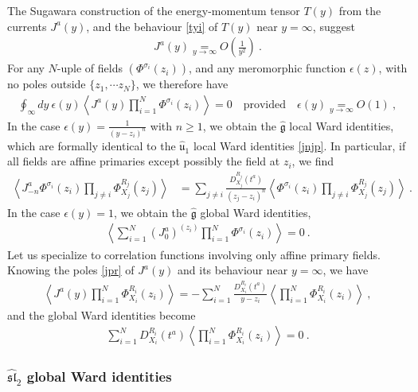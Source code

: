 \documentclass[12pt, a4paper, notitlepage, twoside]{report}
\numberwithin{equation}{section}
\theoremstyle{break}
\begin{document}
The Sugawara construction of the energy-momentum tensor $T(y)$ from the currents $J^a(y)$, and the behaviour \eqref{tyi} of $T(y)$ near $y=\infty$, suggest
\begin{align}
 \boxed{J^a(y) \underset{y\to \infty}{=} O\left(\frac{1}{y^2}\right)}\ .
\label{jayi}
\end{align}
For any $N$-uple of fields $(\Phi^{\sigma_i}(z_i))$, and any meromorphic function $\epsilon(z)$, with no poles outside $\{z_1,\cdots z_N\}$, we therefore have 
\begin{align}
 \oint_\infty dy\ \epsilon(y) \left\langle J^a(y)  \prod_{i=1}^N \Phi^{\sigma_i}(z_i)\right\rangle = 0 \quad \text{provided} \quad \epsilon(y) \underset{y\to\infty}{=} O(1)\ ,
\end{align}
In the case $\epsilon(y)=\frac{1}{(y-z_i)^n}$ with $n\geq 1$, we obtain the $\hat{\mathfrak{g}}$ local Ward identities, which are formally identical to the $\hat{\mathfrak{u}}_1$ local Ward identities \eqref{jnjp}. 
In particular, if all fields are affine primaries except possibly the field at $z_i$, we find 
\begin{align}
\left\langle J^a_{-n}\Phi^{\sigma_i}(z_i)\prod_{j\neq i} \Phi^{R_j}_{X_j}(z_j)\right\rangle &=\sum_{j\neq i} \frac{D_{X_j}^{R_j}(t^a)}{(z_j-z_i)^n} \left\langle \Phi^{\sigma_i}(z_i)\prod_{j\neq i} \Phi^{R_j}_{X_j}(z_j)\right\rangle\ . 
\label{jmnz}
\end{align}
In the case $\epsilon(y)=1$, we obtain the $\hat{\mathfrak{g}}$ global Ward identities,
\begin{align}
 \left\langle \sum_{i=1}^N (J_0^a)^{(z_i)} \prod_{i=1}^N \Phi^{\sigma_i}(z_i)\right\rangle=0\ .
\end{align}
Let us specialize to correlation functions involving only affine primary fields.
Knowing the poles \eqref{jpr} of $J^a(y)$ and its behaviour near $y=\infty$, we have
\begin{align}
 \left\langle J^a(y) \prod_{i=1}^N \Phi^{R_i}_{X_i}(z_i)\right\rangle = - \sum_{i=1}^N \frac{D^{R_i}_{X_i}(t^a)}{y-z_i}\left\langle \prod_{i=1}^N \Phi^{R_i}_{X_i}(z_i)\right\rangle\ ,
\label{dja}
\end{align}
and the global Ward identities become
\begin{align}
 \sum_{i=1}^N D_{X_i}^{R_i}(t^a) \left\langle \prod_{i=1}^N \Phi^{R_i}_{X_i}(z_i)\right\rangle   = 0 \ .
\label{drxt}
\end{align}

\subsubsection{$\widehat{\mathfrak{sl}}_2$ global Ward identities}
\end{document}
